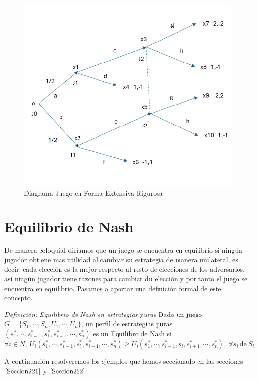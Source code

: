\documentclass[12pt,a4paper,]{book}
\numberwithin{dummy}{section}
\theoremstyle{ocrenumbox}
\theoremstyle{blacknumex}
\theoremstyle{blacknumbox}
\theoremstyle{ocrenum}
\theoremstyle{ocrenum}
\begin{document}
\begin{figure}[H]

{\centering \includegraphics[width=0.8\linewidth]{forma_extensiva_rigurosa} 

}

\caption{\label{forma_extensiva_rigurosa}Diagrama Juego en Forma Extensiva Rigurosa}\label{fig:forma_extensiva_rigurosa}
\end{figure}

\hypertarget{Seccion23}{%
\section{Equilibrio de Nash}\label{Seccion23}}

De manera coloquial diríamos que un juego se encuentra en equilibrio si
ningún jugador obtiene mas utilidad al cambiar su estrategia de manera
unilateral, es decir, cada elección es la mejor respecto al resto de
elecciones de los adversarios, así ningún jugador tiene razones para
cambiar du elección y por tanto el juego se encuentra en equilibrio.
Pasamos a aportar una definición formal de este concepto.

\emph{Definición: Equilibrio de Nash en estrategias puras} Dado un juego
\(G=\{S_1,\cdots,S_n,U_1,\cdots,U_n\}\), un perfil de estrategias puras
\((s_1^*,\cdots,s_{i-1}^*,s_i^*,s_{i+1}^*,\cdots,s_n^*)\) es un
Equilibro de Nash si \[
\forall i \in N, \ U_i(s_1^*,\cdots,s_{i-1}^*,s_i^*,s_{i+1}^*,\cdots,s_n^*) \geq U_i(s_1^*,\cdots,s_{i-1}^*,s_i,s_{i+1}^*,\cdots,s_n^*), \ \forall s_i \ \text{de} \ S_i
\]

A continuación resolveremos los ejemplos que hemos seccionado en las
secciones \(\ref{Seccion221}\) y \(\ref{Seccion222}\)
\end{document}

